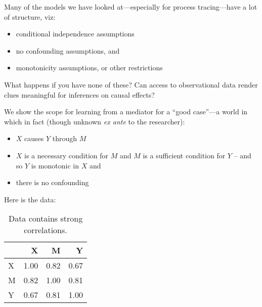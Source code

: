 \documentclass[
  12pt,
]{book}
\newenvironment{Shaded}{\begin{snugshade}}{\end{snugshade}}
\newcommand{\DataTypeTok}[1]{\textcolor[rgb]{0.13,0.29,0.53}{#1}}
\newcommand{\DecValTok}[1]{\textcolor[rgb]{0.00,0.00,0.81}{#1}}
\newcommand{\FloatTok}[1]{\textcolor[rgb]{0.00,0.00,0.81}{#1}}
\newcommand{\KeywordTok}[1]{\textcolor[rgb]{0.13,0.29,0.53}{\textbf{#1}}}
\newcommand{\NormalTok}[1]{#1}
\newcommand{\OperatorTok}[1]{\textcolor[rgb]{0.81,0.36,0.00}{\textbf{#1}}}
\newcommand{\StringTok}[1]{\textcolor[rgb]{0.31,0.60,0.02}{#1}}
\providecommand{\tightlist}{%
  \setlength{\itemsep}{0pt}\setlength{\parskip}{0pt}}
\begin{document}
Many of the models we have looked at---especially for process tracing---have a lot of structure, viz:

\begin{itemize}
\tightlist
\item
  conditional independence assumptions
\item
  no confounding assumptions, and
\item
  monotonicity assumptions, or other restrictions
\end{itemize}

What happens if you have none of these? Can access to observational data render clues meaningful for inferences on causal effects?

We show the scope for learning from a mediator for a ``good case''---a world in which in fact (though unknown \emph{ex ante} to the researcher):

\begin{itemize}
\tightlist
\item
  \(X\) causes \(Y\) through \(M\)
\item
  \(X\) is a necessary condition for \(M\) and \(M\) is a sufficient condition for \(Y\) -- and so \(Y\) is monotonic in \(X\) and
\item
  there is no confounding
\end{itemize}

Here is the data:

\begin{Shaded}
\end{Shaded}

\begin{table}

\caption{\label{tab:unnamed-chunk-106}Data contains strong correlations.}
\centering
\begin{tabular}[t]{l|r|r|r}
\hline
  & X & M & Y\\
\hline
X & 1.00 & 0.82 & 0.67\\
\hline
M & 0.82 & 1.00 & 0.81\\
\hline
Y & 0.67 & 0.81 & 1.00\\
\hline
\end{tabular}
\end{table}
\end{document}
